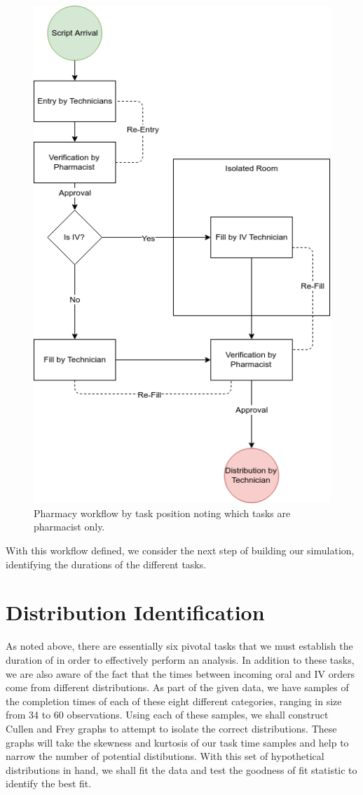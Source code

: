 \documentclass[10pt]{report}            %
\begin{document}
\begin{figure}[H]
\centering
\includegraphics[scale=.5]{Flowchart.png}
\caption{Pharmacy workflow by task position noting which tasks are pharmacist only.}
\label{fig:flowchart}
\end{figure}
With this workflow defined, we consider the next step of building our simulation, identifying the durations of the different tasks.
\section*{Distribution Identification}
As noted above, there are essentially six pivotal tasks that we must establish the duration of in order to effectively perform an analysis. In addition to these tasks, we are also aware of the fact that the times between incoming oral and IV orders come from different distributions. As part of the given data, we have samples of the completion times of each of these eight different categories, ranging in size from 34 to 60 observations. Using each of these samples, we shall construct Cullen and Frey graphs to attempt to isolate the correct distributions. These graphs will take the skewness and kurtosis of our task time samples and help to narrow the number of potential distibutions. With this set of hypothetical distributions in hand, we shall fit the data and test the goodness of fit statistic to identify the best fit.
\end{document}
